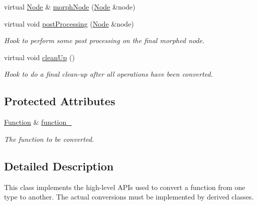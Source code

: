 \begin{DoxyCompactItemize}
virtual \hyperlink{classglow_1_1_node}{Node} \& \hyperlink{classglow_1_1_function_converter_a2e2d68b35109983d63e5b38cabe7b652}{morph\+Node} (\hyperlink{classglow_1_1_node}{Node} \&node)
\item 
\mbox{\label{classglow_1_1_function_converter_aeee98175ffd8d13a1fdd7e38d38811b2}} 
virtual void \hyperlink{classglow_1_1_function_converter_aeee98175ffd8d13a1fdd7e38d38811b2}{post\+Processing} (\hyperlink{classglow_1_1_node}{Node} \&node)
\begin{DoxyCompactList}\small\item\em Hook to perform some post processing on the final morphed node. \end{DoxyCompactList}\item 
\mbox{\label{classglow_1_1_function_converter_a503372fedd4a868e3a500f4efd7c0eab}} 
virtual void \hyperlink{classglow_1_1_function_converter_a503372fedd4a868e3a500f4efd7c0eab}{clean\+Up} ()
\begin{DoxyCompactList}\small\item\em Hook to do a final clean-\/up after all operations have been converted. \end{DoxyCompactList}\end{DoxyCompactItemize}
\subsection*{Protected Attributes}
\begin{DoxyCompactItemize}
\item 
\mbox{\label{classglow_1_1_function_converter_af9e16a4f397f0440e21cdd3f54e6151e}} 
\hyperlink{classglow_1_1_function}{Function} \& \hyperlink{classglow_1_1_function_converter_af9e16a4f397f0440e21cdd3f54e6151e}{function\+\_\+}
\begin{DoxyCompactList}\small\item\em The function to be converted. \end{DoxyCompactList}\end{DoxyCompactItemize}


\subsection{Detailed Description}
This class implements the high-\/level A\+P\+Is used to convert a function from one type to another. The actual conversions must be implemented by derived classes. 


